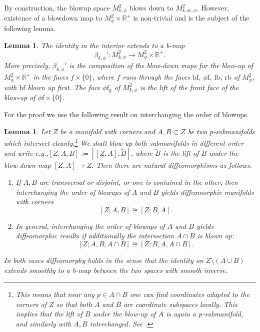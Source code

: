 \documentclass[11pt]{article}
\newcommand{\eg}{e.g.,\xspace}
\numberwithin{equation}{section}
\newenvironment{enumeratea}
{\bgroup\def\theenumi{\alph{enumi}}\begin{enumerate}}
{\end{enumerate}\egroup}
\theoremstyle{plain}
\newtheorem{Lemma}[Th]{Lemma}
\theoremstyle{definition}
\newcommand{\R}{{\mathbb{R}}}
\newcommand{\phif}{{\phi\mathrm{f}}}
\newcommand{\lf}{{\mathrm{lb}}}
\newcommand{\rf}{{\mathrm{rb}}}
\newcommand{\bbf}{{\mathrm{bf}}}
\newcommand{\ssc}{{\mathrm{sc}}}
\begin{document}
By construction, the blowup space $M^{2}_{k, \phi}$
blows down to
$M^{2}_{k, \ssc,\phi}$. However, existence of a blowdown map to
$M^{2}_{\phi} \times \R^+$ is non-trivial and is the subject of the
following lemma.

\begin{Lemma} \label{lemma b-map cons}
The identity in the interior extends to a b-map
\[
\beta_{k,\phi}' : M^{2}_{k,\phi} \to M^{2}_{\phi}\times \R^+.
\]
More precisely, $\beta_{k,\phi}'$ is the composition of the blow-down maps for the blow-up of $M^2_\phi\times \R^+$ in the faces $f\times\{0\}$, where $f$ runs through the faces $\bbf$, $\phif$, $\lf$, $\rf$ of $M^2_\phi$, with $\bbf$ blown up first.
The face $\phif_0$ of $M^2_{k,\phi}$ is the lift of the front face of the blow-up of $\phif\times\{0\}$.
\end{Lemma}

For the proof we use the following result on interchanging the
order of blowups.

\begin{Lemma} \label{lem:commuting blow-ups}
Let $Z$ be a manifold with corners and $A,B\subset Z$ be two
p-submanifolds which intersect cleanly.\footnote{This means that near any $p\in A\cap B$ one can find coordinates adapted to the corners
of $Z$ so that both $A$ and $B$ are coordinate subspaces locally. This implies that the lift of $B$ under the blow-up of $A$ is again a p-submanifold, and similarly with $A,B$ interchanged. See \cite[Prop.\,5.7.2]{Mel-diff}.} We shall blow up both submanifolds in different order and
write \eg $[Z;A,B] := [[Z,A],\widetilde{B}]$, where $\widetilde{B}$ is the lift of
$B$ under the blow-down map $[Z,A]\to Z$. Then there are natural diffeomorphisms as follows.

\begin{enumeratea}
\item\label{lem:commuting blow-upsa}
If $A,B$ are transversal or disjoint, or one is contained in the other, then
interchanging the order of blowups of $A$ and $B$ yields diffeomorphic manifolds with corners
\[
[Z;A,B]\cong[Z;B,A].
\]

\item\label{lem:commuting blow-upsb}
In general, interchanging the order of blowups of
$A$ and $B$ yields diffeomorphic results if additionally the intersection $A\cap B$ is blown up:
\[
[Z; A,B,A\cap B] \cong [Z; B, A, A\cap B].
\]
\end{enumeratea}
In both cases diffeomorphy holds in the sense that the identity on $Z\setminus(A\cup B)$ extends smoothly to a b-map
between the two spaces with smooth inverse.
\end{Lemma}
\end{document}
